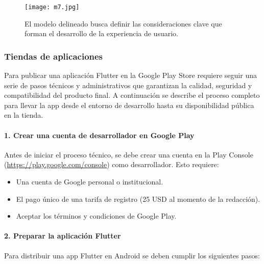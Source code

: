\begin{figure}[h!]
\centering
  \texttt{[image: m7.jpg]}
  \caption{El modelo delineado busca definir las consideraciones clave que forman el desarrollo de la experiencia de usuario. \cite{garrett2011elements}}
  \label{m7}
\end{figure}

\newpage
\subsubsection*{Tiendas de aplicaciones}
Para publicar una aplicación Flutter en la Google Play Store requiere seguir una serie de pasos técnicos y administrativos que garantizan la calidad, seguridad y compatibilidad del producto final. A continuación se describe el proceso completo para llevar la app desde el entorno de desarrollo hasta su disponibilidad pública en la tienda.

\paragraph{1. Crear una cuenta de desarrollador en Google Play}

Antes de iniciar el proceso técnico, se debe crear una cuenta en la Play Console (\url{https://play.google.com/console}) como desarrollador. Esto requiere:

\begin{itemize}
    \item Una cuenta de Google personal o institucional.
    \item El pago único de una tarifa de registro (25 USD al momento de la redacción).
    \item Aceptar los términos y condiciones de Google Play.
\end{itemize}

\paragraph{2. Preparar la aplicación Flutter}

Para distribuir una app Flutter en Android se deben cumplir los siguientes pasos:

